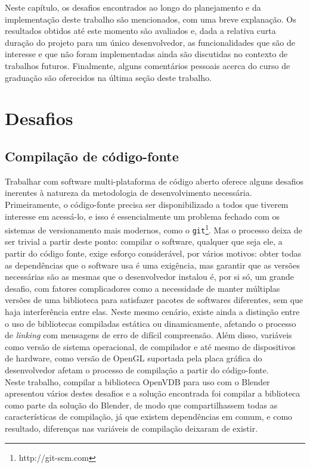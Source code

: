 
Neste capítulo, os desafios encontrados ao longo do planejamento e da implementação deste trabalho são mencionados, com uma breve explanação. Os resultados obtidos até este momento são avaliados e, dada a relativa curta duração do projeto para um único desenvolvedor, as funcionalidades que são de interesse e que não foram implementadas ainda são discutidas no contexto de trabalhos futuros. Finalmente, alguns comentários pessoais acerca do curso de graduação são oferecidos na última seção deste trabalho.

\section{Desafios}

\subsection*{Compilação de código-fonte}

Trabalhar com software multi-plataforma de código aberto oferece alguns desafios inerentes à natureza da metodologia de desenvolvimento necessária. Primeiramente, o código-fonte precisa ser disponibilizado a todos que tiverem interesse em acessá-lo, e isso é essencialmente um problema fechado com os sistemas de versionamento mais modernos, como o \texttt{git}\footnote{http://git-scm.com}. Mas o processo deixa de ser trivial a partir deste ponto: compilar o software, qualquer que seja ele, a partir do código fonte, exige esforço considerável, por vários motivos: obter todas as dependências que o software usa é uma exigência, mas garantir que as versões necessárias são as mesmas que o desenvolvedor instalou é, por si só, um grande desafio, com fatores complicadores como a necessidade de manter múltiplas versões de uma biblioteca para satisfazer pacotes de softwares diferentes, sem que haja interferência entre elas. Neste mesmo cenário, existe ainda a distinção entre o uso de bibliotecas compiladas estática ou dinamicamente, afetando o processo de {\it linking} com mensagens de erro de difícil compreensão. Além disso, variáveis como versão de sistema operacional, de compilador e até mesmo de dispositivos de hardware, como versão de OpenGL suportada pela placa gráfica do desenvolvedor afetam o processo de compilação a partir do código-fonte.\\

Neste trabalho, compilar a biblioteca OpenVDB para uso com o Blender apresentou vários destes desafios e a solução encontrada foi compilar a biblioteca como parte da solução do Blender, de modo que compartilhassem todas as características de compilação, já que existem dependências em comum, e como resultado, diferenças nas variáveis de compilação deixaram de existir. 


